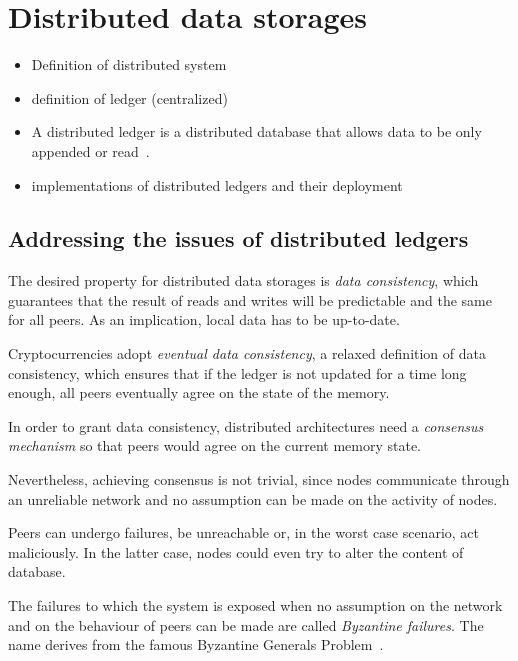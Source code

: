 \chapter{Distributed data storages}
\label{intro}

\begin{itemize}
	\item Definition of distributed system

	\item definition of ledger (centralized)

	\item A distributed ledger is a distributed database that allows data to be only appended or read~\cite{Sunyaev2020}. 

	\item implementations of distributed ledgers and their deployment
\end{itemize}

\section{Addressing the issues of distributed ledgers}\label{ledgerproblems}
The desired property  for distributed data storages is \emph{data consistency}, which guarantees that the result of reads and writes will be predictable and the same for all peers. As an implication, local data has to be up-to-date.

Cryptocurrencies adopt \emph{eventual data consistency}, a relaxed definition of data consistency, which ensures that if the ledger is not updated for a time long enough, all peers eventually agree on the state of the memory.

In order to grant data consistency, distributed architectures need a \emph{consensus mechanism} so that peers would agree on the current memory state.

Nevertheless, achieving consensus is not trivial, since nodes communicate through an unreliable network and no assumption can be made on the activity of nodes.

Peers can undergo failures, be unreachable or, in the worst case scenario, act maliciously. In the latter case, nodes could even try to alter the content of database.

The failures to which the system is exposed when no assumption on the network and on the behaviour of peers can be made are called \emph{Byzantine failures}. The name derives from the famous Byzantine Generals Problem~\cite{bgp}.

